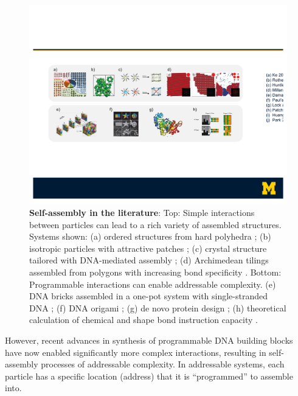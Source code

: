 \begin{figure}[t]
\begin{center}
\includegraphics[width=6.5in]{../figures/1-LiteratureReview.pdf}
\caption{
\textbf{Self-assembly in the literature}:
Top: Simple interactions between particles can lead to a rich variety of assembled structures.
Systems shown: 
(a) ordered structures from hard polyhedra \cite{Damasceno_2012_Science};
(b) isotropic particles with attractive patches \cite{Zhang_2004_NanoLetters};
(c) crystal structure tailored with DNA-mediated assembly \cite{Park_2008_Nature};
(d) Archimedean tilings assembled from polygons with increasing bond specificity \cite{Millan_2014_ACSNano}.
Bottom: Programmable interactions can enable addressable complexity.
(e) DNA bricks assembled in a one-pot system with single-stranded DNA \cite{Ke_2012_Science};
(f) DNA origami \cite{Rothemund_2006_Nature};
(g) de novo protein design \cite{Huang_2016_Nature};
(h) theoretical calculation of chemical and shape bond instruction capacity \cite{Huntley_2016_PNAS}.
}
\label{fig:litreview}
\end{center}
\end{figure}

However, recent advances in synthesis of programmable DNA building blocks have now enabled significantly more complex interactions, resulting in self-assembly processes of addressable complexity.
In addressable systems, each particle has a specific location (address) that it is ``programmed'' to assemble into.

